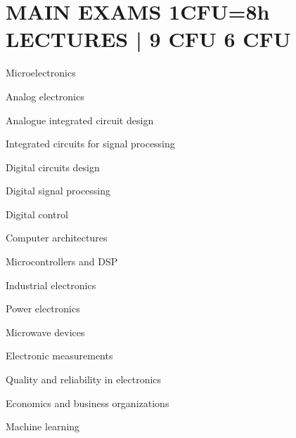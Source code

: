 \newcommand{\redminus}{\textcolor{matred}{\faMinus}}
\newcommand{\blueminus}{\textcolor{matblue}{\faMinus}}

\section*{MAIN EXAMS
            \hfill
            1CFU=8h LECTURES \hspace{1mm} | \hspace{1mm} 
            \textcolor{matred}{\faMinus \hspace{1mm} 9 CFU}
            \textcolor{matblue}{\faMinus \hspace{1mm} 6 CFU}
            }
\begin{minipage}[t]{0.45\textwidth}
    \begin{description}[leftmargin=5mm]
        \item[\redminus] Microelectronics
        \item[\redminus] Analog electronics
        \item[\blueminus] Analogue integrated circuit design
        \item[\blueminus] Integrated circuits for signal processing
        \item[\blueminus] Digital circuits design
        \item[\blueminus] Digital signal processing
        \item[\blueminus] Digital control
        \item[\redminus] Computer architectures
    \end{description}
\end{minipage}
\hfill
\begin{minipage}[t]{0.45\textwidth}
    \begin{description}[leftmargin=5mm]
        \item[\blueminus] Microcontrollers and DSP
        \item[\redminus] Industrial electronics 
        \item[\redminus] Power electronics
        \item[\redminus] Microwave devices
        \item[\redminus] Electronic measurements
        \item[\blueminus] Quality and reliability in electronics
        \item[\redminus] Economics and business organizations 
        \item[\redminus] Machine learning
    \end{description}
\end{minipage}